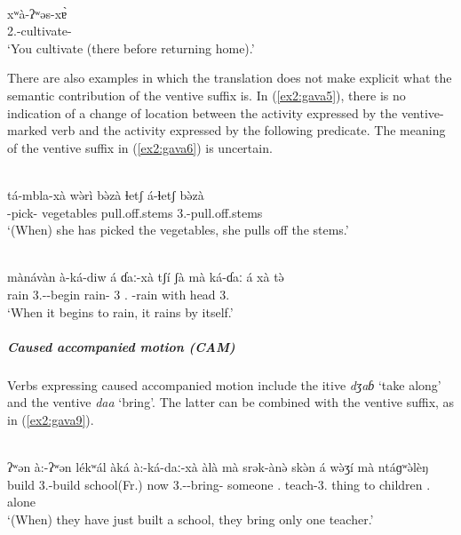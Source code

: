 \ex\label{ex2:gava4}
 \\
\gll  xʷà-ʔʷəs-xɐ̀ \\
2.-cultivate- \\
\glt `You cultivate (there before returning home).'
\z 

There are also examples in which the translation does not make explicit what the semantic contribution of the ventive suffix is. In (\ref{ex2:gava5}), there is no indication of a change of location between the activity expressed by the ventive-marked verb and the activity expressed by the following predicate. The meaning of the ventive suffix in (\ref{ex2:gava6}) is uncertain.

\ea\label{ex2:gava5}
 \\
\gll tá-mbla-xà	wə̀rì	bə̀zà	ɬetʃ	á-ɬetʃ	bə̀zà \\
-pick-	vegetables		pull.off.stems	3.-pull.off.stems	 \\
\glt `(When) she has picked the vegetables, she pulls off the stems.'

\ex\label{ex2:gava6}
 \\
\gll  mànávàn	à-ká-diw	á	ɗaː-xà	tʃí ʃà	mà	ká-ɗaː	á	xà	tə̀ \\
rain	3.--begin		rain-	 3	.	-rain	with	head	3. \\
\glt `When it begins to rain, it rains by itself.'
\z

\subparagraph{Caused accompanied motion (CAM)}

Verbs expressing caused accompanied motion include the itive \textit{dʒaɓ} `take along' and the ventive \textit{daa} `bring'. The latter can be combined with the ventive suffix, as in (\ref{ex2:gava9}).

\ea\label{ex2:gava9}
 \\
\gll ʔʷən à:-ʔʷən lékʷál àká à:-ká-daː-xà àlà  mà srək-ànə̀ skə̀n á wə̀ʒí mà ntáɡʷə̀lèŋ\\
build 3.-build school(Fr.) now 3.--bring- someone . teach-3. thing to children . alone \\
\glt `(When) they have just built a school, they bring only one teacher.'
\z 


